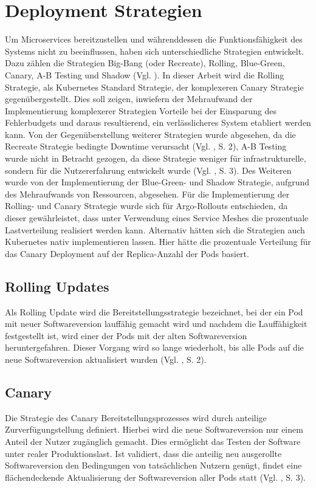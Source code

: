 \documentclass[
12pt,
a4paper,
twoside,
openright
]{report}
\begin{document}
	\section{Deployment Strategien}
	Um Microservices bereitzustellen und währenddessen die Funktionsfähigkeit des Systems nicht zu beeinflussen, haben sich unterschiedliche Strategien entwickelt. Dazu zählen die Strategien Big-Bang (oder Recreate), Rolling, Blue-Green, Canary, A-B Testing und Shadow (Vgl. \parencite{deployStraDie}). In dieser Arbeit wird die Rolling Strategie, als Kubernetes Standard Strategie, der komplexeren Canary Strategie gegenübergestellt. Dies soll zeigen, inwiefern der Mehraufwand der Implementierung komplexerer Strategien Vorteile bei der Einsparung des Fehlerbudgets und daraus resultierend, ein verlässlicheres System etabliert werden kann. Von der Gegenüberstellung weiterer Strategien wurde abgesehen, da die Recreate Strategie bedingte Downtime verursacht (Vgl. \parencite{deployStraDie}, S. 2), A-B Testing wurde nicht in Betracht gezogen, da diese Strategie weniger für infrastrukturelle, sondern für die Nutzererfahrung entwickelt wurde (Vgl. \parencite{deployStraDie}, S. 3). Des Weiteren wurde von der Implementierung der Blue-Green- und Shadow Strategie, aufgrund des Mehraufwands von Ressourcen, abgesehen.
	Für die Implementierung der Rolling- und Canary Strategie wurde sich für Argo-Rollouts entschieden, da dieser gewährleistet, dass unter Verwendung eines Service Meshes die prozentuale Lastverteilung realisiert werden kann. Alternativ hätten sich die Strategien auch Kubernetes nativ implementieren lassen. Hier hätte die prozentuale Verteilung für das Canary Deployment auf der Replica-Anzahl der Pods basiert. 
	
	\subsection{Rolling Updates}
	Als Rolling Update wird die Bereitstellungsstrategie bezeichnet, bei der ein Pod mit neuer Softwareversion lauffähig gemacht wird und nachdem die Lauffähigkeit festgestellt ist, wird einer der Pods mit der alten Softwareversion heruntergefahren. Dieser Vorgang wird so lange wiederholt, bis alle Pods auf die neue Softwareversion aktualisiert wurden (Vgl. \parencite{deployStraDie}, S. 2).
	
	\subsection{Canary}
	Die Strategie des Canary Bereitstellungsprozesses wird durch anteilige Zurverfügungstellung definiert. Hierbei wird die neue Softwareversion nur einem Anteil der Nutzer zugänglich gemacht. Dies ermöglicht das Testen der Software unter realer Produktionslast. Ist validiert, dass die anteilig neu ausgerollte Softwareversion den Bedingungen von tatsächlichen Nutzern genügt, findet eine flächendeckende Aktualisierung der Softwareversion aller Pods statt (Vgl. \parencite{deployStraDie}, S. 3).
	
\end{document}
